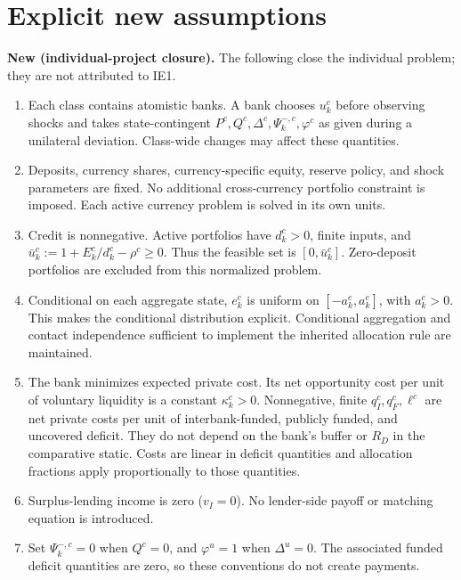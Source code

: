 \documentclass[11pt,a4paper]{article}
\newcommand{\newa}{\textbf{New (individual-project closure).}}
\begin{document}
\section{Explicit new assumptions}
\newa{} The following close the individual problem; they are not attributed to IE1.
\begin{enumerate}[leftmargin=*,itemsep=3pt]
\item Each class contains atomistic banks. A bank chooses $u_k^c$ before observing shocks and takes state-contingent $P^c,Q^c,\Delta^c,\Psi_k^{-,c},\varphi^c$ as given during a unilateral deviation. Class-wide changes may affect these quantities.
\item Deposits, currency shares, currency-specific equity, reserve policy, and shock parameters are fixed. No additional cross-currency portfolio constraint is imposed. Each active currency problem is solved in its own units.
\item Credit is nonnegative. Active portfolios have $d_k^c>0$, finite inputs, and $\bar u_k^c:=1+E_k^c/d_k^c-\rho^c\geq0$. Thus the feasible set is $[0,\bar u_k^c]$. Zero-deposit portfolios are excluded from this normalized problem.
\item Conditional on each aggregate state, $e_k^c$ is uniform on $[-a_k^c,a_k^c]$, with $a_k^c>0$. This makes the conditional distribution explicit. Conditional aggregation and contact independence sufficient to implement the inherited allocation rule are maintained.
\item The bank minimizes expected private cost. Its net opportunity cost per unit of voluntary liquidity is a constant $\kappa_k^c>0$. Nonnegative, finite $q_I^c,q_F^c,\ell^c$ are net private costs per unit of interbank-funded, publicly funded, and uncovered deficit. They do not depend on the bank's buffer or $R_D$ in the comparative static. Costs are linear in deficit quantities and allocation fractions apply proportionally to those quantities.
\item Surplus-lending income is zero ($v_I=0$). No lender-side payoff or matching equation is introduced.
\item Set $\Psi_k^{-,c}=0$ when $Q^c=0$, and $\varphi^u=1$ when $\Delta^u=0$. The associated funded deficit quantities are zero, so these conventions do not create payments.
\end{enumerate}
\end{document}
